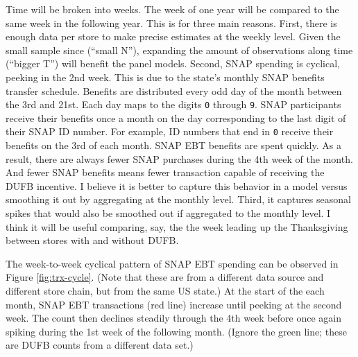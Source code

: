 \documentclass[12pt,letterpaperpaper,]{book}
\begin{document}
Time will be broken into weeks. The week of one year will be compared to
the same week in the following year. This is for three main reasons.
First, there is enough data per store to make precise estimates at the
weekly level. Given the small sample since (``small N''), expanding the
amount of observations along time (``bigger T'') will benefit the panel
models. Second, SNAP spending is cyclical, peeking in the 2nd week. This
is due to the state's monthly SNAP benefits transfer schedule. Benefits
are distributed every odd day of the month between the 3rd and 21st.
Each day maps to the digits \texttt{0} through \texttt{9}. SNAP
participants receive their benefits once a month on the day
corresponding to the last digit of their SNAP ID number. For example, ID
numbers that end in \texttt{0} receive their benefits on the 3rd of each
month. SNAP EBT benefits are spent quickly. As a result, there are
always fewer SNAP purchases during the 4th week of the month. And fewer
SNAP benefits means fewer transaction capable of receiving the DUFB
incentive. I believe it is better to capture this behavior in a model
versus smoothing it out by aggregating at the monthly level. Third, it
captures seasonal spikes that would also be smoothed out if aggregated
to the monthly level. I think it will be useful comparing, say, the the
week leading up the Thanksgiving between stores with and without DUFB.

The week-to-week cyclical pattern of SNAP EBT spending can be observed
in Figure \ref{fig:trx-cycle}. (Note that these are from a different
data source and different store chain, but from the same US state.) At
the start of the each month, SNAP EBT transactions (red line) increase
until peeking at the second week. The count then declines steadily
through the 4th week before once again spiking during the 1st week of
the following month. (Ignore the green line; these are DUFB counts from
a different data set.)
\end{document}
